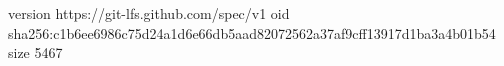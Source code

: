 version https://git-lfs.github.com/spec/v1
oid sha256:c1b6ee6986c75d24a1d6e66db5aad82072562a37af9cff13917d1ba3a4b01b54
size 5467
